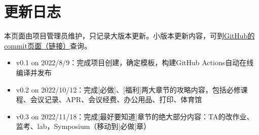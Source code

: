 \chapter{更新日志}

本页面由项目管理员维护，只记录大版本更新。小版本更新内容，可到\href{https://github.com/kaiwu-astro/xp_pgrs_unofficial_guide/commits/main}{GitHub的commit页面（链接）}查询。

\begin{itemize}
    \item v0.1 on 2022/8/9：完成项目创建，确定模板，构建GitHub Actions自动在线编译并发布
    \item v0.2 on 2022/10/12：完成[必做]、[福利]两大章节的攻略内容，包括必修课程、会议记录、APR、会议经费、办公用品、打印、体育馆
    \item v0.3 on 2022/11/18：完成[最好要知道]章节的绝大部分内容：TA的改作业、监考、lab，Symposium（移动到[必做]章）
\end{itemize}


